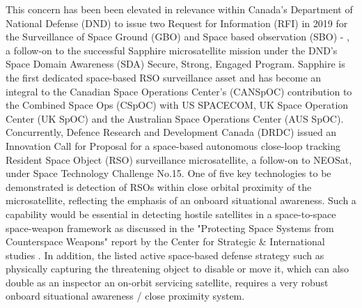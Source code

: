
This concern has been been elevated in relevance within Canada's Department of National Defense (DND) to issue two Request for Information (RFI) in 2019 for the Surveillance of Space Ground (GBO) and Space based observation (SBO) \cite{dndRfi19a} - \cite{dndRfi19b}, a follow-on to the successful Sapphire microsatellite mission under the DND's Space Domain Awareness (SDA) Secure, Strong, Engaged Program. Sapphire is the first dedicated space-based RSO surveillance asset and has become an integral to the Canadian Space Operations Center's (CANSpOC) contribution to the Combined Space Ops (CSpOC) with US SPACECOM,  UK Space Operation Center (UK SpOC) and the Australian Space Operations Center (AUS SpOC). Concurrently, Defence Research and Development Canada (DRDC) issued an Innovation Call for Proposal  \cite{drdcCall19} for a space-based autonomous close-loop tracking Resident Space Object (RSO) surveillance microsatellite, a follow-on to NEOSat, under Space Technology Challenge No.15. One of five key technologies to be demonstrated is detection of RSOs within close orbital proximity of the microsatellite, reflecting the emphasis of an onboard situational awareness. Such a capability would be essential in detecting hostile satellites in a space-to-space space-weapon framework as discussed in the "Protecting Space Systems from Counterspace Weapons" report by the Center for Strategic \& International studies \cite{darkArts21}. In addition, the listed active space-based defense strategy such as physically capturing the threatening object to disable or move it, which can also double as an inspector an on-orbit servicing satellite, requires a very robust onboard situational awareness / close proximity system.  

